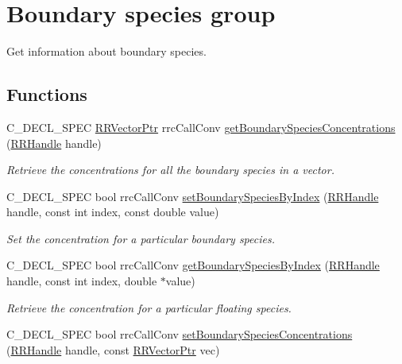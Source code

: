 \hypertarget{group__boundary}{\section{Boundary species group}
\label{group__boundary}
}


Get information about boundary species.  


\subsection*{Functions}
\begin{DoxyCompactItemize}
\item 
C\-\_\-\-D\-E\-C\-L\-\_\-\-S\-P\-E\-C \hyperlink{rrc__types_8h_a3be72d6006034fd349f753d2bf441bf7}{R\-R\-Vector\-Ptr} rrc\-Call\-Conv \hyperlink{group__boundary_gaa36e026ba8f7488c7a57e96c0471763b}{get\-Boundary\-Species\-Concentrations} (\hyperlink{rrc__types_8h_a1d68f0592372208fa5a5f2799ea4b3ae}{R\-R\-Handle} handle)
\begin{DoxyCompactList}\small\item\em Retrieve the concentrations for all the boundary species in a vector. \end{DoxyCompactList}\item 
C\-\_\-\-D\-E\-C\-L\-\_\-\-S\-P\-E\-C bool rrc\-Call\-Conv \hyperlink{group__boundary_gadf834c3d92ac79a778dfcd5d97d3e340}{set\-Boundary\-Species\-By\-Index} (\hyperlink{rrc__types_8h_a1d68f0592372208fa5a5f2799ea4b3ae}{R\-R\-Handle} handle, const int index, const double value)
\begin{DoxyCompactList}\small\item\em Set the concentration for a particular boundary species. \end{DoxyCompactList}\item 
C\-\_\-\-D\-E\-C\-L\-\_\-\-S\-P\-E\-C bool rrc\-Call\-Conv \hyperlink{group__boundary_ga5bdb50a2653fc268731aaba05d7b7377}{get\-Boundary\-Species\-By\-Index} (\hyperlink{rrc__types_8h_a1d68f0592372208fa5a5f2799ea4b3ae}{R\-R\-Handle} handle, const int index, double $\ast$value)
\begin{DoxyCompactList}\small\item\em Retrieve the concentration for a particular floating species. \end{DoxyCompactList}\item 
C\-\_\-\-D\-E\-C\-L\-\_\-\-S\-P\-E\-C bool rrc\-Call\-Conv \hyperlink{group__boundary_gacc067866a08d07a196d681328b5b3e38}{set\-Boundary\-Species\-Concentrations} (\hyperlink{rrc__types_8h_a1d68f0592372208fa5a5f2799ea4b3ae}{R\-R\-Handle} handle, const \hyperlink{rrc__types_8h_a3be72d6006034fd349f753d2bf441bf7}{R\-R\-Vector\-Ptr} vec)

\end{DoxyCompactItemize}
